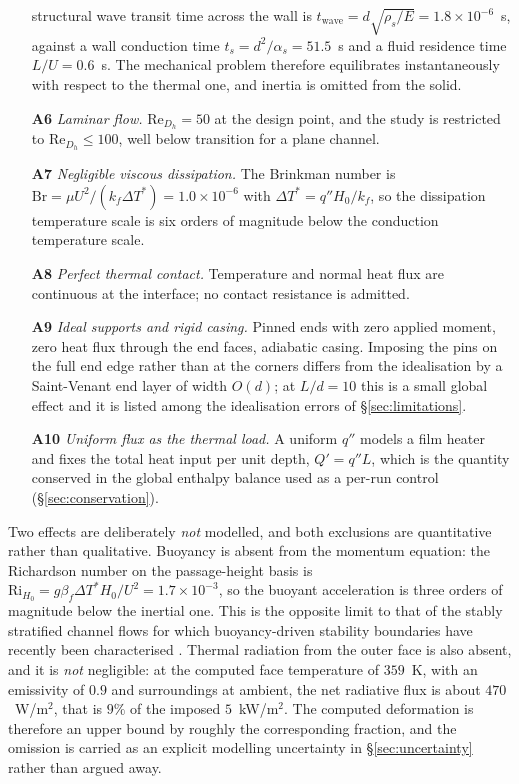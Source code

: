 \documentclass[11pt,a4paper]{article}
\newcommand{\ReDh}{\mathrm{Re}_{D_h}}
\begin{document}
\begin{enumerate}
structural wave transit time across the wall is
$t_{\mathrm{wave}}=d\sqrt{\rho_s/E}=1.8\times10^{-6}$~s, against a wall
conduction time $t_s=d^2/\alpha_s=51.5$~s and a fluid residence time
$L/U=0.6$~s. The mechanical problem therefore equilibrates instantaneously
with respect to the thermal one, and inertia is omitted from the solid.
\item[\textbf{A6}] \emph{Laminar flow.} $\ReDh=50$ at the design point, and
the study is restricted to $\ReDh\le100$, well below transition for a plane
channel.
\item[\textbf{A7}] \emph{Negligible viscous dissipation.} The Brinkman number
is $\mathrm{Br}=\mu U^2/(k_f\Delta T^{*})=1.0\times10^{-6}$ with
$\Delta T^{*}=q''H_0/k_f$, so the dissipation temperature scale is six orders
of magnitude below the conduction temperature scale.
\item[\textbf{A8}] \emph{Perfect thermal contact.} Temperature and normal heat
flux are continuous at the interface; no contact resistance is admitted.
\item[\textbf{A9}] \emph{Ideal supports and rigid casing.} Pinned ends with
zero applied moment, zero heat flux through the end faces, adiabatic casing.
Imposing the pins on the full end edge rather than at the corners differs
from the idealisation by a Saint-Venant end layer of width $O(d)$; at
$L/d=10$ this is a small global effect and it is listed among the
idealisation errors of \S\ref{sec:limitations}.
\item[\textbf{A10}] \emph{Uniform flux as the thermal load.} A uniform $q''$
models a film heater and fixes the total heat input per unit depth,
$Q'=q''L$, which is the quantity conserved in the global enthalpy balance
used as a per-run control (\S\ref{sec:conservation}).
\end{enumerate}

Two effects are deliberately \emph{not} modelled, and both exclusions are
quantitative rather than qualitative. Buoyancy is absent from the momentum
equation: the Richardson number on the passage-height basis is
$\mathrm{Ri}_{H_0}=g\beta_f\Delta T^{*}H_0/U^2=1.7\times10^{-3}$, so the
buoyant acceleration is three orders of magnitude below the inertial one.
This is the opposite limit to that of the stably stratified channel flows for
which buoyancy-driven stability boundaries have recently been characterised
\citep{draskic2025stability}. Thermal radiation from the outer face is also
absent, and it is \emph{not} negligible: at the computed face temperature of
$359$~K, with an emissivity of $0.9$ and surroundings at ambient, the net
radiative flux is about $470$~W/m$^2$, that is $9\%$ of the imposed
$5$~kW/m$^2$. The computed deformation is therefore an upper bound by roughly
the corresponding fraction, and the omission is carried as an explicit
modelling uncertainty in \S\ref{sec:uncertainty} rather than argued away.
\end{document}
